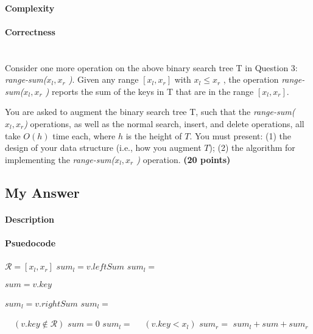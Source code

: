 \documentclass{article}
\begin{document}
\paragraph{Complexity}

\paragraph{Correctness}






\section{}

 Consider one more operation on the above binary search tree T in
 Question 3: \emph{range-sum($x_l ,x_r$ )}. Given any range $[x_l ,x_r
 ]$ with $x_l \le x_r$ , the operation \emph{range-sum($x_l ,x_r$ )}
 reports the sum of the keys in T that are in the range $[x_l ,x_r ]$.

You are asked to augment the binary search tree T, such that the
\emph{range-sum($x_l ,x_r $)} operations, as well as the normal search,
  insert, and delete operations, all take $O(h)$ time each, where $h$
 is the height of $T$.
You must present: (1) the design of your data structure (i.e., how you
augment $T$); (2) the algorithm for implementing the
\emph{range-sum($x_l ,x_r$ )} operation. {\bf (20 points)  }


\subsection{My Answer}
\paragraph{Description}


\paragraph{Psuedocode}

{\singlespacing
\begin{algorithmic}
  \State $\mathcal{R} = \left[x_l,x_r\right]$
  \EndIf
      \State $sum_l = v.leftSum$
    \Else 
      \State $sum_l = $       
    \EndIf
    
    \State $sum = v.key$

      \State $sum_l = v.rightSum$
    \Else 
      \State $sum_l = $       
    \EndIf

  \Else $\quad(v.key \notin \mathcal{R})$
    \State $sum = 0$
      \State $sum_l = $
    \Else $\quad (v.key < x_l)$
      \State $sum_r = $
    \EndIf
  \EndIf
   $sum_l + sum + sum_r$
\EndFunction
\end{algorithmic}
}
\end{document}
